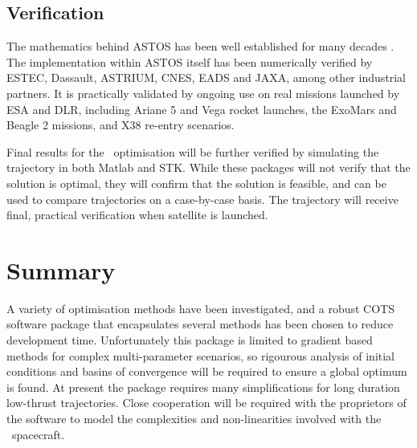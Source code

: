 \subsection{Verification} \label{sub:ASTOS-Verification}

The mathematics behind ASTOS has been well established for many decades \parencite{Kaplan1976}. The implementation within ASTOS itself has been numerically verified by ESTEC, Dassault, ASTRIUM, CNES, EADS and JAXA, among other industrial partners. It is practically validated by ongoing use on real missions launched by ESA and DLR, including Ariane 5 and Vega rocket launches, the ExoMars and Beagle 2 missions, and X38 re-entry scenarios.
 
Final results for the \BW\ optimisation will be further verified by simulating the trajectory in both Matlab and STK. While these packages will not verify that the solution is optimal, they will confirm that the solution is feasible, and can be used to compare trajectories on a case-by-case basis. The trajectory will receive final, practical verification when satellite is launched.

\section{Summary} \label{sec:Optimisation-Summary}

A variety of optimisation methods have been investigated, and a robust COTS software package that encapsulates several methods has been chosen to reduce development time. Unfortunately this package is limited to gradient based methods for complex multi-parameter scenarios, so rigourous analysis of initial conditions and basins of convergence will be required to ensure a global optimum is found. At present the package requires many simplifications for long duration low-thrust trajectories. Close cooperation will be required with the proprietors of the software to model the complexities and non-linearities involved with the \BW\ spacecraft.
 
\clearpage